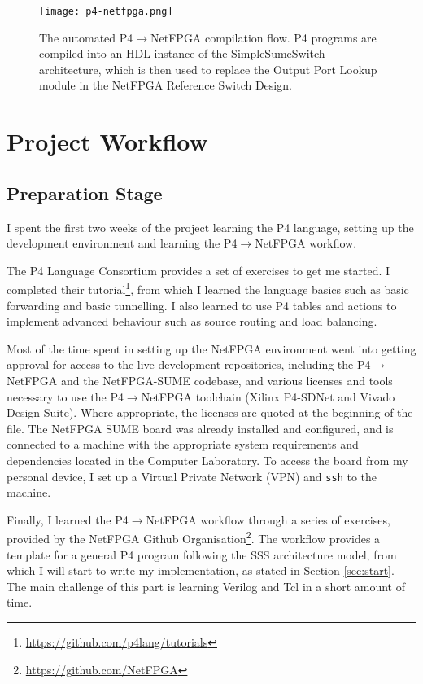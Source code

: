\begin{figure}[!ht]
	\centering
	\texttt{[image: p4-netfpga.png]}
	\caption{The automated P4$\rightarrow$NetFPGA compilation flow. P4 programs are compiled into an HDL instance of the SimpleSumeSwitch architecture, which is then used to replace the Output Port Lookup module in the NetFPGA Reference Switch Design.}
	\label{p4-netfpga}
\end{figure}

\section{Project Workflow}
	\subsection{Preparation Stage}
	I spent the first two weeks of the project learning the P4 language, setting up the development environment and learning the P4$\rightarrow$NetFPGA workflow.
	
	The P4 Language Consortium \cite{p4.org} provides a set of exercises to get me started. I completed their tutorial\footnote{\url{https://github.com/p4lang/tutorials}}, from which I learned the language basics such as basic forwarding and basic tunnelling. I also learned to use P4 tables and actions to implement advanced behaviour such as source routing and load balancing. 
	
	Most of the time spent in setting up the NetFPGA environment went into getting approval for access to the live development repositories, including the P4$\rightarrow$NetFPGA and the NetFPGA-SUME codebase, and various licenses and tools necessary to use the P4$\rightarrow$NetFPGA toolchain (Xilinx P4-SDNet and Vivado Design Suite). Where appropriate, the licenses are quoted at the beginning of the file. The NetFPGA SUME board was already installed and configured, and is connected to a machine with the appropriate system requirements and dependencies located in the Computer Laboratory. To access the board from my personal device, I set up a Virtual Private Network (VPN) and \texttt{ssh} to the machine.
	
	Finally, I learned the P4$\rightarrow$NetFPGA workflow through a series of exercises, provided by the NetFPGA Github Organisation\footnote{\url{https://github.com/NetFPGA}}. The workflow provides a template for a general P4 program following the SSS architecture model, from which I will start to write my implementation, as stated in Section \ref{sec:start}. The main challenge of this part is learning Verilog and Tcl in a short amount of time.
	
